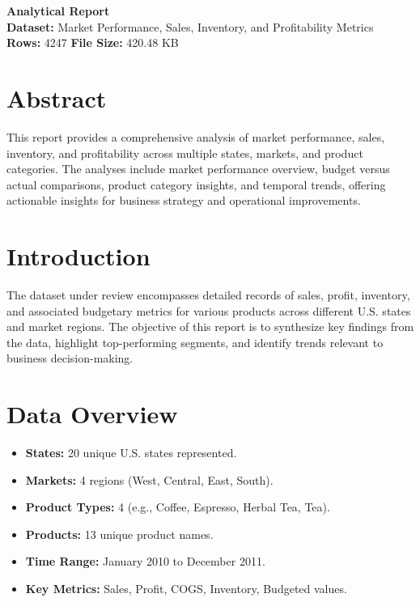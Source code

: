 \documentclass[11pt]{article}
\begin{document}
\begin{center}
    {\LARGE \textbf{Analytical Report}}\\[1em]
    \textbf{Dataset:} Market Performance, Sales, Inventory, and Profitability Metrics\\
    \textbf{Rows:} 4247 \hspace{1cm} \textbf{File Size:} 420.48 KB
\end{center}

\section*{Abstract}
This report provides a comprehensive analysis of market performance, sales, inventory, and profitability across multiple states, markets, and product categories. The analyses include market performance overview, budget versus actual comparisons, product category insights, and temporal trends, offering actionable insights for business strategy and operational improvements.

\section{Introduction}
The dataset under review encompasses detailed records of sales, profit, inventory, and associated budgetary metrics for various products across different U.S. states and market regions. The objective of this report is to synthesize key findings from the data, highlight top-performing segments, and identify trends relevant to business decision-making.

\section{Data Overview}
\begin{itemize}
    \item \textbf{States:} 20 unique U.S. states represented.
    \item \textbf{Markets:} 4 regions (West, Central, East, South).
    \item \textbf{Product Types:} 4 (e.g., Coffee, Espresso, Herbal Tea, Tea).
    \item \textbf{Products:} 13 unique product names.
    \item \textbf{Time Range:} January 2010 to December 2011.
    \item \textbf{Key Metrics:} Sales, Profit, COGS, Inventory, Budgeted values.
\end{itemize}
\end{document}
